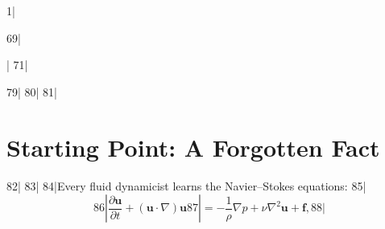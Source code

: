 1|\documentclass[11pt,a4paper]{article}
\begin{document}
69||
71|\begin{abstract}
72|We propose a fundamental epistemological reconstruction: turbulence is not a closure problem, but an \textbf{unidentifiability problem}（unidentifiability problem）。
73|出发点极为简单——牛顿第二定律 $\bm{F}=m\bm{a}$ 严格描述每一个分子的运动。$N$ 体分子动力学（MD）在热力学极限 $N\to\infty$ 下应收敛到 Boltzmann 方程，进而到 Navier--Stokes（NS）方程。但宇宙中没有任何计算设备可以模拟 $10^{23}$ 个分子。任何有限分辨率的模拟都必然产生截断误差。
74|
75|This paper presents three theorems. \textbf{定理~1}（不可辨识定理）：在有限分辨率观测下，真实湍流、截断误差伪影和过度平滑的 RANS 场在总变差距离意义下不可区分——$\TV(P_h^{\mathcal{W}_A}, P_h^{\mathcal{W}_B}) \leq C\cdot h^{\alpha}$，且当 $h\to 0$ 时 $\TV\to 0$，但任意有限 $h>0$ 下 $\TV>0$。\textbf{定理~2}（多模型审计定理）：$M$ 个独立湍流模型（RANS $k$-$\varepsilon$, $k$-$\omega$ SST, LES, DES, DNS粗网格）同时产生超过 $\Delta$ 的systematic bias的概率满足 $\mathbb{P}(\cap_{m=1}^{M}\{B_m > \Delta\}) \leq \exp(-2M\Delta^2/L^2)$，以 DNS 细网格为真值锚点，证明模型共识的可靠性随模型数量指数增长。\textbf{定理~3}（Kolmogorov 谱截断定理）：在有限分辨率 $h$ 下观测能谱严格分解为 $E_h(k) = E_{\text{true}}(k) + C_{\text{res}}\cdot h^{2/3}\cdot k^{-5/3} + C_{\text{stat}}\cdot N^{-1/2} + o(h^{2/3} + N^{-1/2})$，当截断误差项与统计涨落项在惯性区量级相当时，$-5/3$ 谱从截断误差中涌现——Kolmogorov 谱不是物理定律，而是有限分辨率下的数学必然。
76|
77|The corollary: turbulence modeling is not about better closure models — it is about declaring your \textbf{resolution assumption}. At different resolutions, turbulence is different things.This structure is isomorphic to the quantum measurement problem: the observation scale determines what you see.
78|\end{abstract}
79|
80|%
81|\section{Starting Point: A Forgotten Fact}
82|%
83|
84|Every fluid dynamicist learns the Navier--Stokes equations:
85|\begin{equation}\label{eq:ns}
86|  \frac{\partial \bm{u}}{\partial t} + (\bm{u}\cdot\nabla)\bm{u}
87|  = -\frac{1}{\rho}\nabla p + \nu \nabla^2 \bm{u} + \bm{f},
88|\end{equation}
\end{document}
